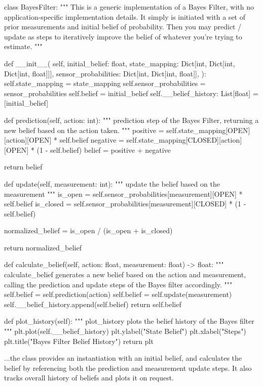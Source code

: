 \documentclass{article}
\begin{document}
\begin{python}
    class BayesFilter:
    """
    This is a generic implementation of a Bayes Filter, with no
    application-specific implementation details. It simply is
    initiated with a set of prior measurements and initial belief
    of probability. Then you may predict / update as steps to
    iteratively improve the belief of whatever you're trying to
    estimate.
    """

    def __init__(
    self,
    initial_belief: float,
    state_mapping: Dict[int, Dict[int, Dict[int, float]]],
    sensor_probabilities: Dict[int, Dict[int, float]],
    ):
    self.state_mapping = state_mapping
    self.sensor_probabilities = sensor_probabilities
    self.belief = initial_belief
    self.__belief_history: List[float] = [initial_belief]

    def prediction(self, action: int):
    """
    prediction step of the Bayes Filter, returning a new belief
    based on the action taken.
    """
    positive = self.state_mapping[OPEN][action][OPEN] * self.belief
    negative = self.state_mapping[CLOSED][action][OPEN] * (1 - self.belief)
    belief = positive + negative

    return belief

    def update(self, measurement: int):
    """
    update the belief based on the measurement
    """
    is_open = self.sensor_probabilities[measurement][OPEN] * self.belief
    is_closed = self.sensor_probabilities[measurement][CLOSED] * (1 - self.belief)

    normalized_belief = is_open / (is_open + is_closed)

    return normalized_belief

    def calculate_belief(self, action: float, measurement: float) -> float:
    """
    calculate_belief generates a new belief based on the action
    and measurement, calling the prediction and update steps of
    the Bayes filter accordingly.
    """
    self.belief = self.prediction(action)
    self.belief = self.update(measurement)
    self.__belief_history.append(self.belief)
    return self.belief

    def plot_history(self):
    """
    plot_history plots the belief history of the Bayes filter
    """
    plt.plot(self.__belief_history)
    plt.ylabel("State Belief")
    plt.xlabel("Steps")
    plt.title("Bayes Filter Belief History")
    return plt
\end{python}

...the class provides an instantiation with an initial belief, and calculates the belief by referencing both the prediction and measurement update steps. It also tracks overall history of beliefs and plots it on request.
\end{document}
